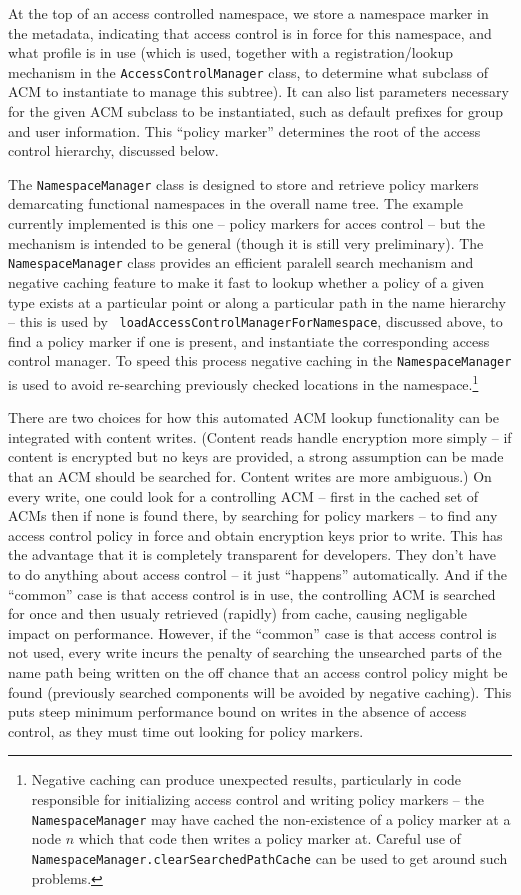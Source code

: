 At the top of an access controlled namespace, we store a namespace
marker in the metadata, indicating that access control is in force for
this namespace, and what profile is in use (which is used, together
with a registration/lookup mechanism in the {\tt AccessControlManager}
class, to determine what subclass of ACM to instantiate to manage this
subtree). It can also list parameters necessary for the given ACM
subclass to be instantiated, such as default prefixes for group and
user information. This ``policy marker'' determines the root of the
access control hierarchy, discussed below.

The {\tt NamespaceManager} class is designed to store and retrieve
policy markers demarcating functional namespaces in the overall name
tree. The example currently implemented is this one -- policy markers
for acces control -- but the mechanism is intended to be general
(though it is still very preliminary). The {\tt NamespaceManager}
class provides an efficient paralell search mechanism and negative
caching feature to make it fast to lookup whether a policy of a given
type exists at a particular point or along a particular path in the
name hierarchy -- this is used by {\tt
  loadAccessControlManagerForNamespace}, discussed above, to find a
policy marker if one is present, and instantiate the corresponding
access control manager. To speed this process negative caching in the
{\tt NamespaceManager} is used to avoid re-searching previously
checked locations in the namespace.\footnote{Negative caching can
  produce unexpected results, particularly in code responsible for
  initializing access control and writing policy markers -- the {\tt
    NamespaceManager} may have cached the non-existence of a policy
  marker at a node $n$ which that code then writes a policy marker
  at. Careful use of {\tt NamespaceManager.clearSearchedPathCache} can
  be used to get around such problems.}

There are two choices for how this automated ACM lookup functionality
can be integrated with content writes. (Content reads handle
encryption more simply -- if content is encrypted but no keys are
provided, a strong assumption can be made that an ACM should be
searched for. Content writes are more ambiguous.) On every write, one
could look for a controlling ACM -- first in the cached set of ACMs
then if none is found there, by searching for policy markers -- to
find any access control policy in force and obtain encryption keys
prior to write.  This has the advantage that it is completely
transparent for developers. They don't have to do anything about
access control -- it just ``happens'' automatically. And if the
``common'' case is that access control is in use, the controlling ACM
is searched for once and then usualy retrieved (rapidly) from cache,
causing negligable impact on performance. However, if the ``common''
case is that access control is not used, every write incurs the
penalty of searching the unsearched parts of the name path being
written on the off chance that an access control policy might be found
(previously searched components will be avoided by negative
caching). This puts steep minimum performance bound on writes in the
absence of access control, as they must time out looking for policy
markers.

